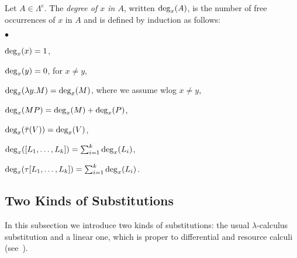 \documentclass{LMCS}
\newcommand{\bag}[1]{[#1]}
\newcommand{\lam}{\ensuremath{\lambda}}
\newcommand{\Set}[1]{\Lambda^{#1}}
\newcommand{\gt}{\ensuremath{\tau}}
\newcommand{\gto}{\ensuremath{\bar\tau}}
\begin{document}
\begin{defi}\label{def:degree} Let $A\in\Set{e}$. The \emph{degree of $x$ in $A$}, written $\mathrm{deg}_{x}(A)$, is the number of free occurrences of $x$ in $A$ 
and is defined by induction as follows:
\begin{iteMize}{$\bullet$}
\item $\mathrm{deg}_{x}(x) = 1$,
\item $\mathrm{deg}_{x}(y) = 0$, for $x\neq y$,
\item $\dg{x}{\lam y.M} = \dg{x}{M}$, where we assume wlog $x\neq y$,
\item $\mathrm{deg}_{x}(MP) = \mathrm{deg}_{x}(M) + \mathrm{deg}_{x}(P)$,
\item $\dg{x}{\gto(V)} = \dg{x}{V}$,
\item $\dg{x}{\bag{L_1, \ldots, L_k}} = \sum_{i=1}^{k} \dg{x}{L_i}$,
\item $\dg{x}{\gt[L_1, \ldots, L_k]} = \sum_{i=1}^{k} \dg{x}{L_i}$.
\end{iteMize}
\end{defi}

\subsection{Two Kinds of Substitutions}\label{subs:Subst}

In this subsection we introduce two kinds of substitutions: the usual \lam-calculus substitution and a linear one, 
which is proper to  differential and resource calculi (see\ 
\cite{Boudol93,EhrhardR03,Tranquilli10}).
\end{document}

